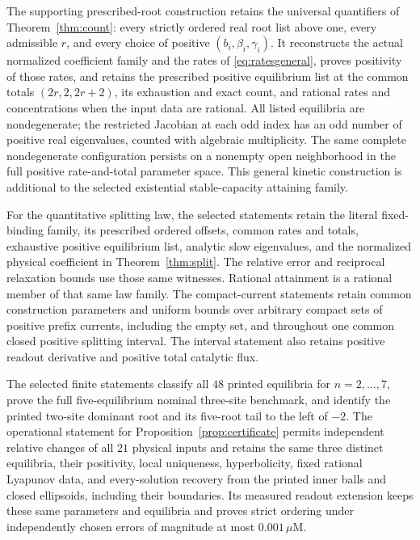 The supporting prescribed-root construction retains the universal quantifiers of
Theorem~\ref{thm:count}: every strictly ordered real root list above one, every admissible
\(r\), and every choice of positive \((b_i,\beta_i,\gamma_i)\). It reconstructs the actual
normalized coefficient family and the rates of \eqref{eq:ratesgeneral}, proves positivity
of those rates, and retains the prescribed positive equilibrium list at the common totals
\((2r,2,2r+2)\), its exhaustion and exact count, and rational rates and concentrations
when the input data are rational. All listed equilibria are nondegenerate; the restricted
Jacobian at each odd index has an odd number of positive real eigenvalues, counted with
algebraic multiplicity. The same complete nondegenerate configuration persists on a
nonempty open neighborhood in the full positive rate-and-total parameter space.
This general kinetic construction is additional to the selected existential
stable-capacity attaining family.

For the quantitative splitting law, the selected statements retain the literal
fixed-binding family, its prescribed ordered offsets, common rates and totals, exhaustive
positive equilibrium list, analytic slow eigenvalues, and the normalized physical
coefficient in Theorem~\ref{thm:split}. The relative error and reciprocal relaxation bounds
use those same witnesses. Rational attainment is a rational member of that same law family.
The compact-current statements retain common construction parameters and uniform bounds
over arbitrary compact sets of positive prefix currents, including the empty set, and
throughout one common closed positive splitting interval. The interval statement also
retains positive readout derivative and positive total catalytic flux.

The selected finite statements classify all \(48\) printed equilibria for \(n=2,\ldots,7\),
prove the full five-equilibrium nominal three-site benchmark, and identify the printed
two-site dominant root and its five-root tail to the left of \(-2\). The operational
statement for Proposition~\ref{prop:certificate} permits independent relative changes of
all \(21\) physical inputs and retains the same three distinct equilibria, their positivity,
local uniqueness, hyperbolicity, fixed rational Lyapunov data, and every-solution recovery
from the printed inner balls and closed ellipsoids, including their boundaries. Its measured
readout extension keeps these same parameters and equilibria and proves strict ordering
under independently chosen errors of magnitude at most \(0.001\,\mu\mathrm M\).

